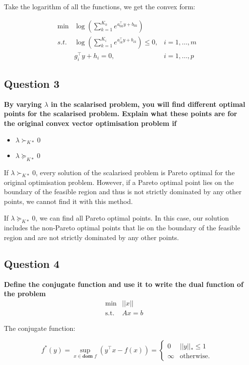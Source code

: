 Take the logarithm of all the functions, we get the convex form:

$$
\begin{array}{lll}
\min & \log\left(\sum_{k=1}^{K_0} e^{a_{0k}^\top y + b_{0k}}\right) &\\
s.t. & \log\left(\sum_{k=1}^{K_i} e^{a_{ik}^\top y + b_{ik}}\right) \le 0, & i = 1,\dots,m\\
& g_i^\top y + h_i = 0,  & i = 1,\dots,p
\end{array} 
$$

\subsection*{Question 3}
\textbf{By varying $\lambda$ in the scalarised problem, you will find different optimal points for the scalarised problem. Explain what these points are for the original convex vector optimisation problem if}

\begin{itemize}
    \item \textbf{$\lambda \succ_{K*} 0$}
    \item \textbf{$\lambda \succcurlyeq_{K*} 0$}
\end{itemize}

If $\lambda \succ_{K*} 0$, every solution of the scalarised problem is Pareto optimal for the original optimisation problem. However, if a Pareto optimal point lies on the boundary of the feasible region and thus is not strictly dominated by any other points, we cannot find it with this method.  

If $\lambda \succcurlyeq_{K*} 0$, we can find all Pareto optimal points. In this case, our solution includes the non-Pareto optimal points that lie on the boundary of the feasible region and are not strictly dominated by any other points.


\subsection*{Question 4}
\textbf{Define the conjugate function and use it to write the dual function of the problem
$$
\begin{array}{lll}
    \text{min} & ||x|| & \\
    \text{s.t.} & Ax = b 
\end{array}
$$}

The conjugate function:

$$
f^*(y) = \sup_{x\in\textbf{dom }f}\left(y^\top x - f(x)  \right) = \left\{\begin{array}{ll} 0 & ||y||_*\le 1 \\ \infty & \text{otherwise.}  \end{array} \right.
$$

